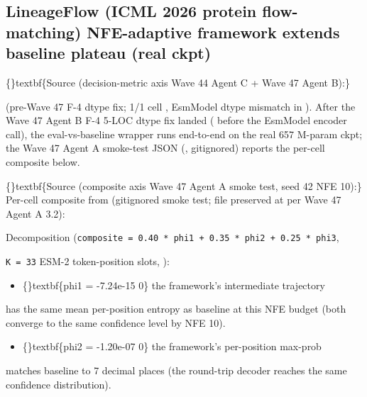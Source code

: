 \documentclass{article}
\begin{document}
\subsection{LineageFlow (ICML 2026 protein flow-matching)  NFE-adaptive framework extends baseline plateau (real ckpt)}
\{\}textbf\{Source (decision-metric axis  Wave 44 Agent C + Wave 47 Agent B):\}

 (pre-Wave 47 F-4 dtype fix; 1/1 cell , EsmModel dtype mismatch in ). After the Wave 47 Agent B F-4 5-LOC dtype fix landed ( before the EsmModel encoder call), the eval-vs-baseline wrapper runs end-to-end on the real 657 M-param ckpt; the Wave 47 Agent A smoke-test JSON (, gitignored) reports the per-cell composite below.

\{\}textbf\{Source (composite axis  Wave 47 Agent A smoke test, seed 42 NFE 10):\} Per-cell composite from  (gitignored smoke test; file preserved at  per Wave 47 Agent A 3.2):

\begin{table}[ht]
\centering
\small
{}%
\end{table}

Decomposition (\texttt{composite = 0.40 * phi1 + 0.35 * phi2 + 0.25 * phi3},

\texttt{K = 33} ESM-2 token-position slots, ):

\begin{itemize}
\item \{\}textbf\{phi1 = -7.24e-15  0\}  the framework's intermediate trajectory
\end{itemize}
has the same mean per-position entropy as baseline at this NFE budget (both converge to the same confidence level by NFE 10).

\begin{itemize}
\item \{\}textbf\{phi2 = -1.20e-07  0\}  the framework's per-position max-prob
\end{itemize}
matches baseline to 7 decimal places (the round-trip decoder reaches the same confidence distribution).
\end{document}
